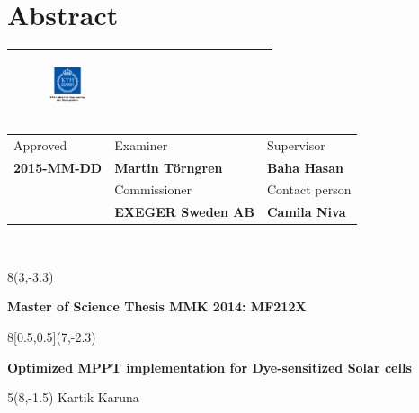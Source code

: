 
\chapter*{Abstract}


\begin{tabular}{ | p{\dimexpr \linewidth-2\tabcolsep} |} \hline
 \begin{figure}[H]
        
        \includegraphics[width=0.2\textwidth]{images/indust} 
             \end{figure}  \\\hline
\end{tabular}   
\begin{tabular}{ | p{} |
                  p{} |
                  p{} |} \hline
                 Approved & Examiner & Supervisor \\
                  \textbf{2015-MM-DD}  & \textbf{Martin Törngren} & \textbf{Baha Hasan} \\\hline
                   & Commissioner & Contact person \\
                    & \textbf{EXEGER Sweden AB} & \textbf{Camila Niva}\\ \hline
\end{tabular} \\

\begin{textblock}{8}(3,-3.3)
\begin{center}
\textbf{Master of Science Thesis MMK 2014: MF212X }
\end{center}
\end{textblock}
\begin{textblock}{8}[0.5,0.5](7,-2.3)
\begin{center}
\textbf{Optimized MPPT implementation for Dye-sensitized Solar cells}
\end{center}
\end{textblock}
\begin{textblock}{5}(8,-1.5)
Kartik Karuna
\end{textblock}

